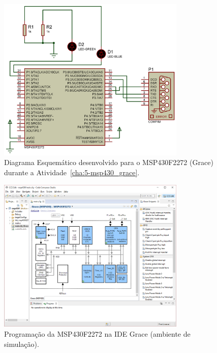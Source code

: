 \documentclass[
	12pt,				%
	openright,			%
  oneside,     %
	a4paper,			%
	english,			%
	french,				%
	spanish,			%
	brazil				%
	]{abntex2}
\begin{document}
\begin{figure}[ht]
  \centering
  \caption{\label{fig:Atividade-05-05-Schematic-01}Diagrama Esquemático desenvolvido para o MSP430F2272 (Grace) durante a Atividade~\ref{cha:5-msp430_grace}.}
  \includegraphics[width=0.8\textwidth]{images/Atividade05/Atividade-05-05-Schematic-01-recortado.png}
\end{figure}

\begin{figure}[ht]
  \centering
  \caption{\label{fig:APP-Grace00}Programação da MSP430F2272 na IDE Grace (ambiente de simulação).}
  \includegraphics[width=0.8\textwidth]{images/Atividade05/APP-Grace00.png}
\end{figure}
\end{document}
